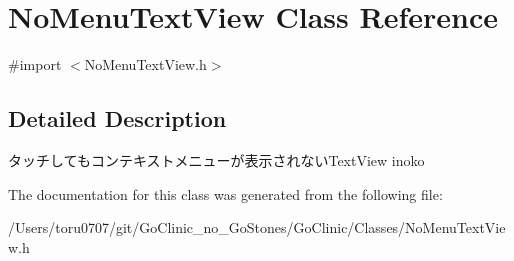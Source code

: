 \hypertarget{interface_no_menu_text_view}{
\section{NoMenuTextView Class Reference}
\label{interface_no_menu_text_view}
}


{\ttfamily \#import $<$NoMenuTextView.h$>$}



\subsection{Detailed Description}
タッチしてもコンテキストメニューが表示されないTextView  inoko 

The documentation for this class was generated from the following file:\begin{DoxyCompactItemize}
\item 
/Users/toru0707/git/GoClinic\_\-no\_\-GoStones/GoClinic/Classes/NoMenuTextView.h\end{DoxyCompactItemize}
